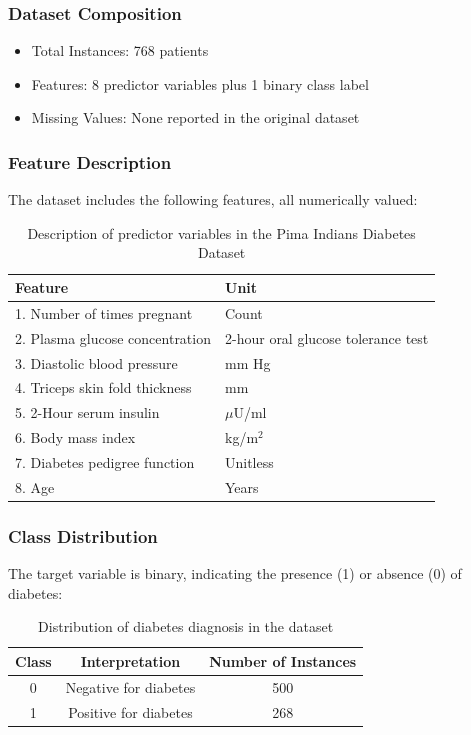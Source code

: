 \documentclass[a4paper,12pt]{article}
\begin{document}
\subsubsection{Dataset Composition}
\begin{itemize}
    \item Total Instances: 768 patients
    \item Features: 8 predictor variables plus 1 binary class label
    \item Missing Values: None reported in the original dataset
\end{itemize}

\subsubsection{Feature Description}
The dataset includes the following features, all numerically valued:
\begin{table}[h]
\centering
\begin{tabular}{p{}p{}}
\hline
\textbf{Feature} & \textbf{Unit} \\
\hline
1. Number of times pregnant & Count \\
2. Plasma glucose concentration & 2-hour oral glucose tolerance test \\
3. Diastolic blood pressure & mm Hg \\
4. Triceps skin fold thickness & mm \\
5. 2-Hour serum insulin & $\mu$U/ml \\
6. Body mass index & kg/m$^2$ \\
7. Diabetes pedigree function & Unitless \\
8. Age & Years \\
\hline
\end{tabular}
\caption{Description of predictor variables in the Pima Indians Diabetes Dataset}
\label{tab:features}
\end{table}

\subsubsection{Class Distribution}
The target variable is binary, indicating the presence (1) or absence (0) of diabetes:
\begin{table}[h]
\centering
\begin{tabular}{ccc}
\hline
\textbf{Class} & \textbf{Interpretation} & \textbf{Number of Instances} \\
\hline
0 & Negative for diabetes & 500 \\
1 & Positive for diabetes & 268 \\
\hline
\end{tabular}
\caption{Distribution of diabetes diagnosis in the dataset}
\label{tab:class_distribution}
\end{table}
\end{document}
